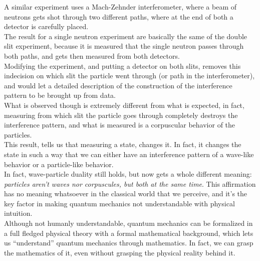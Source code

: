\documentclass[../qm.tex]{subfiles}
\begin{document}
	A similar experiment uses a Mach-Zehnder interferometer, where a beam of neutrons gets shot through two different paths, where at the end of both a detector is carefully placed.\\
	The result for a single neutron experiment are basically the same of the double slit experiment, because it is measured that the single neutron passes through both paths, and gets then measured from both detectors.\\
	Modifying the experiment, and putting a detector on both slits, removes this indecision on which slit the particle went through (or path in the interferometer), and would let a detailed description of the construction of the interference pattern to be brought up from data.\\
	What is observed though is extremely different from what is expected, in fact, measuring from which slit the particle goes through completely destroys the interference pattern, and what is measured is a corpuscular behavior of the particles.\\
	This result, tells us that measuring a state, changes it. In fact, it changes the state in such a way that we can either have an interference pattern of a wave-like behavior or a particle-like behavior.\\
	In fact, wave-particle duality still holds, but now gets a whole different meaning: \textit{particles aren't waves nor corpuscules, but both at the same time}. This affirmation has no meaning whatsoever in the classical world that we perceive, and it's the key factor in making quantum mechanics not understandable with physical intuition.\\
	Although not humanly understandable, quantum mechanics can be formalized in a full fledged physical theory with a formal mathematical background, which lets us ``understand'' quantum mechanics through mathematics. In fact, we can grasp the mathematics of it, even without grasping the physical reality behind it.
\end{document}

